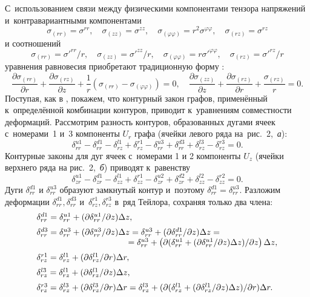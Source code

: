 С~использованием связи между физическими компонентами тензора напряжений и~контравариантными компонентами
$$
\sigma_{(rr)}=\sigma^{rr},\quad
\sigma_{(zz)}=\sigma^{zz},\quad\sigma_{(\varphi\varphi)}=r^2\sigma^{\varphi\varphi},\quad
\sigma_{(rz)}=\sigma^{rz}
$$
и соотношений
$$
\sigma_{(rr)}=\sigma'^{rr}/r,\quad\sigma_{(zz)}=\sigma'^{zz}/r,\quad\sigma_{(\varphi\varphi)}=r\sigma'^{\varphi\varphi},
\quad\sigma_{(rz)}=\sigma'^{rz}/r
$$
уравнения равновесия приобретают традиционную форму \cite{tyr:bib:8}:
$$
\frac{\partial \sigma_{(rr)}}{\partial r}+ \frac{\partial \sigma_{(rz)} }{\partial z} +\frac 1r (\sigma_{(rr)}-\sigma_{(\varphi\varphi)})=0,
\quad 
\frac{\partial \sigma_{(zz)} }{\partial z} + \frac{\partial \sigma_{(rz)} }{ \partial r} +\frac{\sigma_{(rz)}}{r}=0.
$$
Поступая,  как в \cite{tyr:bib:3}, покажем, что контурный закон графов, применённый к~определённой комбинации контуров, приводит к~уравнениям совместности деформаций. 
Рассмотрим разность контуров, образованных дугами ячеек с~номерами~1 и~3 компоненты $U_r$ графа (ячейки левого ряда на~рис.~2,~{\sl а}\/):
\begin{equation}\label{tyrymov:41}
    \delta_{rr}^{u1}-\delta_{rr}^{d1}-\delta_{rz}^{l1}+\delta_{rz}^{r1}
   -\delta_{rr}^{u3}+\delta_{rr}^{d3}+\delta_{rz}^{l3}-\delta_{rz}^{r3}=0.
\end{equation}
Контурные законы для дуг ячеек с~номерами 1 и 2  компоненты $U_z$ (ячейки верхнего ряда на рис.~2,~{\sl б}\/) приводят к~равенству
\begin{equation}\label{tyrymov:42}
    \delta_{zr}^{u1}-\delta_{zr}^{d1}-\delta_{zz}^{l1}+\delta_{zz}^{r1}
   -\delta_{zr}^{u2}+\delta_{zr}^{d2}+\delta_{zz}^{l2}-\delta_{zz}^{r2}=0.
\end{equation}
Дуги $\delta_{rr}^{d1}$ и $\delta_{rr}^{u3}$ образуют замкнутый контур и~поэтому $ \delta_{rr}^{d1}=\delta_{rr}^{u3}$. 
Разложим деформации $\delta_{rr}^{d1},\delta_{rr}^{d3}$ и~$\delta_{rz}^{r1},\delta_{rz}^{r3}$  в~ряд Тейлора, сохраняя только два члена:
\begin{equation}\label{tyrymov:43}
    \begin{array}{l}
      \delta_{rr}^{d1}=\delta_{rr}^{u1}+(\partial \delta_{rr}^{u1}/\partial z)\Delta  z, 
\\[2mm]
      \delta_{rr}^{d3}=\delta_{rr}^{u3}+(\partial \delta_{rr}^{u3}/\partial z)\Delta  z=
      \delta_{rr}^{u3}+(\partial \delta_{rr}^{d1}/\partial z)\Delta  z=
\\
\hspace{3.8cm}
     =\delta_{rr}^{u3}+\left(\partial(\delta_{rr}^{u1}+(\partial \delta_{rr}^{u1}/\partial z)\Delta  z)/\partial z\right)\Delta  z, 
\\[2mm]
     \delta_{rz}^{r1}=\delta_{rz}^{l1}+(\partial \delta_{rz}^{l1}/\partial r)\Delta  r,
\\[2mm]
     \delta_{rz}^{l3}=\delta_{rz}^{l1}+(\partial \delta_{rz}^{l1}/\partial z)\Delta  z, 
\\[2mm]
     \delta_{rz}^{r3}=\delta_{rz}^{l3}+(\partial \delta_{rz}^{l3}/\partial r)\Delta  r=
      \delta_{rz}^{l3}+(\partial( \delta_{rz}^{l1}+(\partial \delta_{rz}^{l1}/\partial z)\Delta  z)/\partial r)
      \Delta  r. 
    \end{array}
\end{equation}
